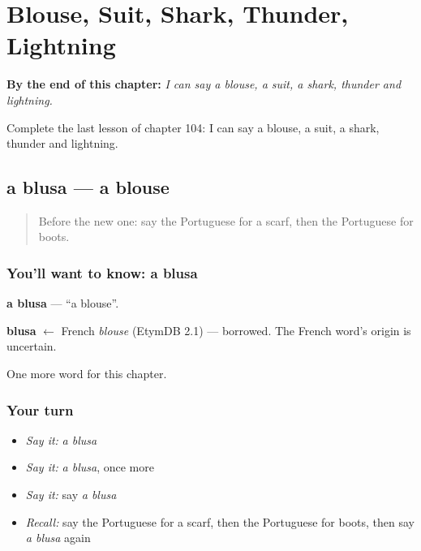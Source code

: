 
\chapter{Blouse, Suit, Shark, Thunder, Lightning}
\label{ch:pt-blouse-suit-shark-thunder-lightning}

\begin{chapteropening}
\textbf{By the end of this chapter:} \emph{I can say a blouse, a suit, a shark, thunder and lightning.}

Complete the last lesson of chapter 104: I can say a blouse, a suit, a shark, thunder and lightning.
\end{chapteropening}

\section[a blusa]{a blusa — a blouse}

\label{lesson:PT-C104-blusa}



\begin{quote}
Before the new one: say the Portuguese for a scarf, then the Portuguese for boots.
\end{quote}

\subsection*{You'll want to know: a blusa}
\textbf{a blusa} — \textquotedblleft{}a blouse\textquotedblright{}.

\begin{cousinweb}
\textbf{blusa} $\leftarrow$ French \emph{blouse} (EtymDB 2.1) — borrowed. The French word's origin is uncertain.
\end{cousinweb}

\begin{grammarlens}[title={What you've built}]
One more word for this chapter.
\end{grammarlens}

\subsection*{Your turn}
\begin{itemize}
\raggedright
  \item \emph{Say it:} \emph{a blusa}
  \item \emph{Say it:} \emph{a blusa}, once more
  \item \emph{Say it:} say \emph{a blusa}
  \item \emph{Recall:} say the Portuguese for a scarf, then the Portuguese for boots, then say \emph{a blusa} again
\end{itemize}

